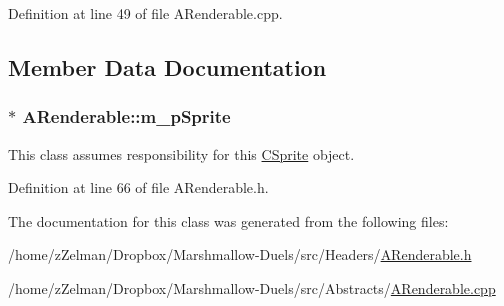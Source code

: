 Definition at line 49 of file A\-Renderable.\-cpp.



\subsection{Member Data Documentation}
\hypertarget{classARenderable_a6030df923c81b400e94ff1f6a9df41f8}{
\subsubsection[{m\-\_\-p\-Sprite}]{$\ast$ A\-Renderable\-::m\-\_\-p\-Sprite\hspace{0.3cm}{\ttfamily [protected]}}}\label{classARenderable_a6030df923c81b400e94ff1f6a9df41f8}


This class assumes responsibility for this \hyperlink{classCSprite}{C\-Sprite} object. 



Definition at line 66 of file A\-Renderable.\-h.



The documentation for this class was generated from the following files\-:\begin{DoxyCompactItemize}
\item 
/home/z\-Zelman/\-Dropbox/\-Marshmallow-\/\-Duels/src/\-Headers/\hyperlink{ARenderable_8h}{A\-Renderable.\-h}\item 
/home/z\-Zelman/\-Dropbox/\-Marshmallow-\/\-Duels/src/\-Abstracts/\hyperlink{ARenderable_8cpp}{A\-Renderable.\-cpp}\end{DoxyCompactItemize}
